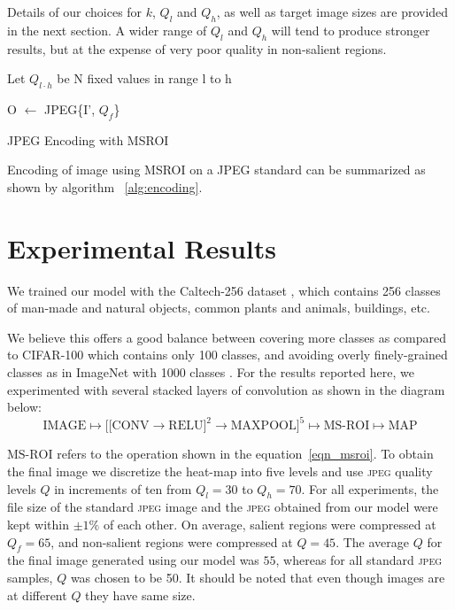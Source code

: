 Details of our choices for $k$, $Q_l$ and $Q_h$, as well as target image sizes are provided in the next section.  A wider range of $Q_l$ and $Q_h$ will tend to produce stronger results, but at the expense of very poor quality in non-salient regions.

\begin{algorithm}[H]

    Let $Q_{l \cdot h}$ be N fixed values in range l to h
    
    O $\gets$ JPEG\{I', $Q_f$\}
\caption[Encoding with MSROI]{JPEG Encoding with MSROI}
\label{alg:encoding}
\end{algorithm}

Encoding of image using MSROI on a JPEG standard can be summarized as shown by algorithm ~\ref{alg:encoding}.



\section{Experimental Results}
We trained our model with the Caltech-256 dataset \cite{xxx_griffin2007caltech}, which contains 256 classes of man-made and natural objects, common plants and animals, buildings, etc.

We believe this offers a good balance between covering more classes as compared to CIFAR-100 which contains only 100 classes, and avoiding overly finely-grained classes as in ImageNet with 1000 classes \cite{xxx_imagenet_cvpr09}.
For the results reported here, we experimented with several stacked layers of convolution as shown in the diagram below:
\begin{equation*}
    \text{IMAGE} \longmapsto \bigg[ \big[ \text{CONV} \rightarrow \text{RELU}\big]^2 \rightarrow \text{MAXPOOL} \bigg]^5 \longmapsto \text{MS-ROI} \longmapsto \text{MAP}
\end{equation*}


$\text{MS-ROI}$ refers to the operation shown in the equation~\ref{eqn_msroi}.
To obtain the final image we discretize the heat-map into five levels and use \textsc{jpeg} quality levels $Q$ in increments of ten from $Q_l=30$ to $Q_h=70$.
For all experiments, the file size of the standard \textsc{jpeg} image and the \textsc{jpeg} obtained from our model were kept within $\pm1\%$ of each other.
On average, salient regions were compressed at $Q_f=65$, and non-salient regions were compressed at $Q=45$.
The average $Q$ for the final image generated using our model was $55$, whereas for all standard \textsc{jpeg} samples, $Q$ was chosen to be 50. It should be noted that even though images are at different $Q$ they have same size.

